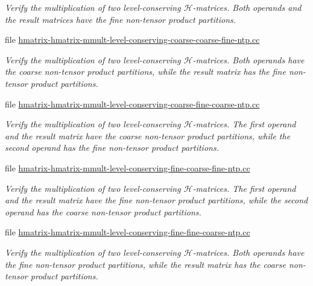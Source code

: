 \begin{DoxyCompactItemize}
\begin{DoxyCompactList}\small\item\em Verify the multiplication of two level-\/conserving $\mathcal{H}$-\/matrices. Both operands and the result matrices have the fine non-\/tensor product partitions. \end{DoxyCompactList}\item 
file \hyperlink{hmatrix-hmatrix-mmult-level-conserving-coarse-coarse-fine-ntp_8cc}{hmatrix-\/hmatrix-\/mmult-\/level-\/conserving-\/coarse-\/coarse-\/fine-\/ntp.\+cc}
\begin{DoxyCompactList}\small\item\em Verify the multiplication of two level-\/conserving $\mathcal{H}$-\/matrices. Both operands have the coarse non-\/tensor product partitions, while the result matrix has the fine non-\/tensor product partitions. \end{DoxyCompactList}\item 
file \hyperlink{hmatrix-hmatrix-mmult-level-conserving-coarse-fine-coarse-ntp_8cc}{hmatrix-\/hmatrix-\/mmult-\/level-\/conserving-\/coarse-\/fine-\/coarse-\/ntp.\+cc}
\begin{DoxyCompactList}\small\item\em Verify the multiplication of two level-\/conserving $\mathcal{H}$-\/matrices. The first operand and the result matrix have the coarse non-\/tensor product partitions, while the second operand has the fine non-\/tensor product partitions. \end{DoxyCompactList}\item 
file \hyperlink{hmatrix-hmatrix-mmult-level-conserving-fine-coarse-fine-ntp_8cc}{hmatrix-\/hmatrix-\/mmult-\/level-\/conserving-\/fine-\/coarse-\/fine-\/ntp.\+cc}
\begin{DoxyCompactList}\small\item\em Verify the multiplication of two level-\/conserving $\mathcal{H}$-\/matrices. The first operand and the result matrix have the fine non-\/tensor product partitions, while the second operand has the coarse non-\/tensor product partitions. \end{DoxyCompactList}\item 
file \hyperlink{hmatrix-hmatrix-mmult-level-conserving-fine-fine-coarse-ntp_8cc}{hmatrix-\/hmatrix-\/mmult-\/level-\/conserving-\/fine-\/fine-\/coarse-\/ntp.\+cc}
\begin{DoxyCompactList}\small\item\em Verify the multiplication of two level-\/conserving $\mathcal{H}$-\/matrices. Both operands have the fine non-\/tensor product partitions, while the result matrix has the coarse non-\/tensor product partitions. \end{DoxyCompactList}\item 

\end{DoxyCompactItemize}
